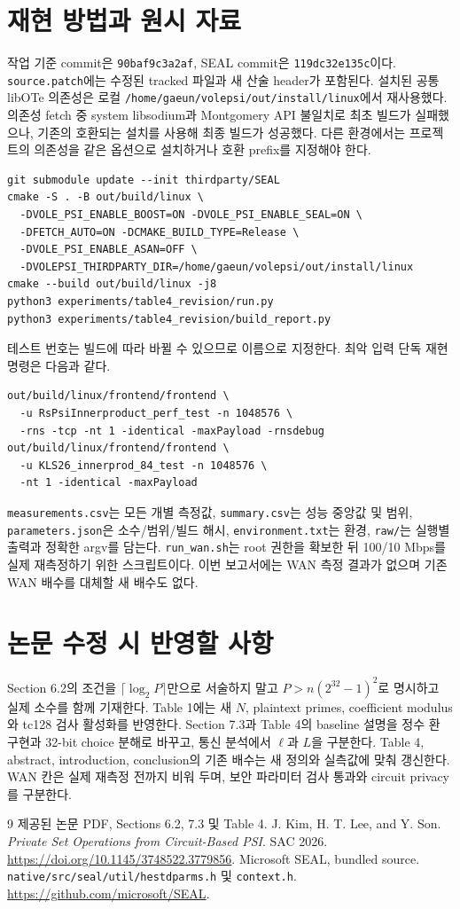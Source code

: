 \documentclass[11pt,a4paper]{article}
\begin{document}
\section{재현 방법과 원시 자료}
작업 기준 commit은 \texttt{90baf9c3a2af},
SEAL commit은 \texttt{119dc32e135c}이다.
\texttt{source.patch}에는 수정된 tracked 파일과 새 산술 header가 포함된다.
설치된 공통 libOTe 의존성은 로컬 \texttt{/home/gaeun/volepsi/out/install/linux}에서 재사용했다.
의존성 fetch 중 system libsodium과 Montgomery API 불일치로 최초 빌드가 실패했으나,
기존의 호환되는 설치를 사용해 최종 빌드가 성공했다.
다른 환경에서는 프로젝트의 의존성을 같은 옵션으로 설치하거나 호환 prefix를 지정해야 한다.
\begin{lstlisting}
git submodule update --init thirdparty/SEAL
cmake -S . -B out/build/linux \
  -DVOLE_PSI_ENABLE_BOOST=ON -DVOLE_PSI_ENABLE_SEAL=ON \
  -DFETCH_AUTO=ON -DCMAKE_BUILD_TYPE=Release \
  -DVOLE_PSI_ENABLE_ASAN=OFF \
  -DVOLEPSI_THIRDPARTY_DIR=/home/gaeun/volepsi/out/install/linux
cmake --build out/build/linux -j8
python3 experiments/table4_revision/run.py
python3 experiments/table4_revision/build_report.py
\end{lstlisting}
테스트 번호는 빌드에 따라 바뀔 수 있으므로 이름으로 지정한다.
최악 입력 단독 재현 명령은 다음과 같다.
\begin{lstlisting}
out/build/linux/frontend/frontend \
  -u RsPsiInnerproduct_perf_test -n 1048576 \
  -rns -tcp -nt 1 -identical -maxPayload -rnsdebug
out/build/linux/frontend/frontend \
  -u KLS26_innerprod_84_test -n 1048576 \
  -nt 1 -identical -maxPayload
\end{lstlisting}

\texttt{measurements.csv}는 모든 개별 측정값,
\texttt{summary.csv}는 성능 중앙값 및 범위,
\texttt{parameters.json}은 소수/범위/빌드 해시,
\texttt{environment.txt}는 환경,
\texttt{raw/}는 실행별 출력과 정확한 argv를 담는다.
\texttt{run\_wan.sh}는 root 권한을 확보한 뒤 100/10 Mbps를 실제 재측정하기 위한 스크립트이다.
이번 보고서에는 WAN 측정 결과가 없으며 기존 WAN 배수를 대체할 새 배수도 없다.

\section{논문 수정 시 반영할 사항}
Section 6.2의 조건을 $\lceil\log_2 P\rceil$만으로 서술하지 말고
$P>n(2^{32}-1)^2$로 명시하고 실제 소수를 함께 기재한다.
Table 1에는 새 $N$, plaintext primes, coefficient modulus와 tc128 검사 활성화를 반영한다.
Section 7.3과 Table 4의 baseline 설명을 정수 환 구현과 32-bit choice 분해로 바꾸고,
통신 분석에서 $\ell$과 $L$을 구분한다.
Table 4, abstract, introduction, conclusion의 기존 배수는 새 정의와 실측값에 맞춰 갱신한다.
WAN 칸은 실제 재측정 전까지 비워 두며, 보안 파라미터 검사 통과와 circuit privacy를 구분한다.

\begin{thebibliography}{9}
\bibitem{paper} 제공된 논문 PDF, Sections 6.2, 7.3 및 Table 4.
\bibitem{kls} J. Kim, H. T. Lee, and Y. Son.
\textit{Private Set Operations from Circuit-Based PSI}. SAC 2026.
\url{https://doi.org/10.1145/3748522.3779856}.
\bibitem{seal} Microsoft SEAL, bundled source.
\texttt{native/src/seal/util/hestdparms.h} 및 \texttt{context.h}.
\url{https://github.com/microsoft/SEAL}.
\end{thebibliography}
\end{document}
